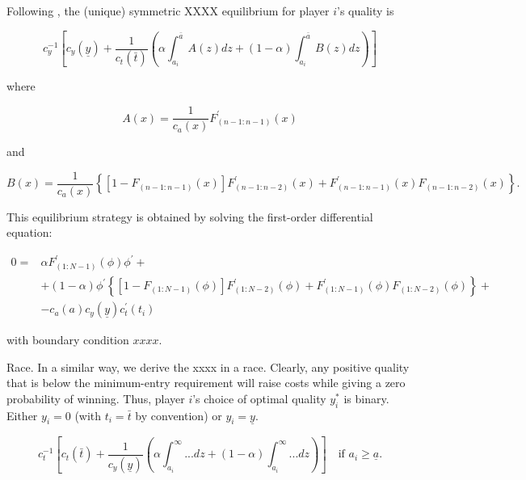 \documentclass[12pt,]{article}
\newcommand\deadline{\bar{t}}
\newcommand\target{\underline{y}}
\newcommand\ctime{c_{t}}
\newcommand\cscore{c_{y}}
\newcommand\mtype{\underline{a}}
\newcommand\hitype{\bar{a}}
\begin{document}
Following \citet{moldovanu2001optimal}, the (unique) symmetric XXXX
equilibrium for player \(i\)'s quality is

\begin{equation}  \label{eq: optimal time tournament}
  \cscore^{-1}
  \left[\cscore(\target) 
    + \frac{1}{\ctime(\deadline)}
    \left(
      \alpha \int_{a_i}^{\hitype} A(z) dz
      + (1-\alpha) \int_{a_i}^{\hitype} B(z)  dz
    \right)
  \right]
\end{equation}

where

\begin{equation}
  A(x) = \frac{1}{c_{a}(x)} F_{(n-1:n-1)}^{\prime}(x)
\end{equation}

and

\begin{equation}
  B(x) = \frac{1}{c_{a}(x)} \left\{
      \left[1- F_{(n-1:n-1)}(x)\right]F_{(n-1:n-2)}^{\prime}(x)
      + F_{(n-1:n-1)}^{\prime}(x) F_{(n-1:n-2)}(x)
    \right\}.
\end{equation}

This equilibrium strategy is obtained by solving the first-order
differential equation:

\begin{align} \label{foc0}
  0 = & \alpha F_{(1:N-1)}^{\prime}(\phi) \phi^{\prime} + \nonumber\\
    & + (1-\alpha)\phi^{\prime}\left\{
        \left[1 - F_{(1:N-1)}(\phi)\right]F_{(1:N-2)}^{\prime}(\phi)
        + F_{(1:N-1)}^{\prime}(\phi) F_{(1:N-2)}(\phi)\right\} + \nonumber\\
    & - c_{a}(a) c_{y}(\target) c_{t}^{\prime}(t_i)
\end{align}

with boundary condition \(xxxx\).

Race. In a similar way, we derive the xxxx in a race. Clearly, any
positive quality that is below the minimum-entry requirement will raise
costs while giving a zero probability of winning. Thus, player \(i\)'s
choice of optimal quality \(y_i^*\) is binary. Either \(y_i=0\) (with
\(t_i=\deadline\) by convention) or \(y_i= \target\).

\begin{equation} 
  \label{eq: optimal time race}
  \ctime^{-1}
  \left[
    \ctime(\deadline) 
    + \frac{1}{\cscore(\target)}\left(
      \alpha \int_{a_i}^{\infty} ... dz
      + (1-\alpha) \int_{a_i}^{\infty} ...  dz
    \right)
  \right]
  \quad \text{if }a_i \geq \mtype.
\end{equation}
\end{document}
